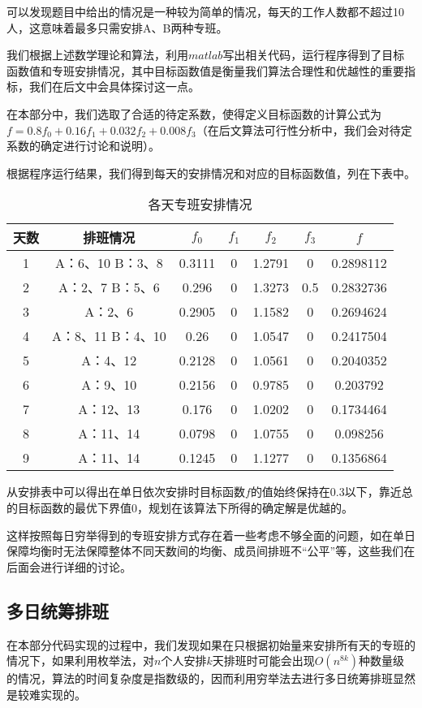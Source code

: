 \documentclass{article}
\begin{document}
	可以发现题目中给出的情况是一种较为简单的情况，每天的工作人数都不超过10人，这意味着最多只需安排A、B两种专班。
	
	我们根据上述数学理论和算法，利用$matlab$写出相关代码，运行程序得到了目标函数值和专班安排情况，其中目标函数值是衡量我们算法合理性和优越性的重要指标，我们在后文中会具体探讨这一点。
	
	在本部分中，我们选取了合适的待定系数，使得定义目标函数的计算公式为$f=0.8f_0+0.16f_1+0.032f_2+0.008f_3$（在后文算法可行性分析中，我们会对待定系数的确定进行讨论和说明）。
	
	根据程序运行结果，我们得到每天的安排情况和对应的目标函数值，列在下表中。
	\newpage
	\begin{table}[!h]
		\centering
		\caption{各天专班安排情况}
		\begin{tabular}{|c|c|c|c|c|c|c|}
			\hline
			天数 & 排班情况          & $f_0$  & $f_1$ & $f_2$  & $f_3$ & $f$     \\
			\hline
			1  & A：6、10 B：3、8  & 0.3111 & 0     & 1.2791 & 0     & 0.2898112 \\
			2  & A：2、7 B：5、6   & 0.296  & 0     & 1.3273 & 0.5   & 0.2832736 \\
			3  & A：2、6         & 0.2905 & 0     & 1.1582 & 0     & 0.2694624 \\
			4  & A：8、11 B：4、10 & 0.26   & 0     & 1.0547 & 0     & 0.2417504 \\
			5  & A：4、12        & 0.2128 & 0     & 1.0561 & 0     & 0.2040352 \\
			6  & A：9、10        & 0.2156 & 0     & 0.9785 & 0     & 0.203792  \\
			7  & A：12、13       & 0.176  & 0     & 1.0202 & 0     & 0.1734464 \\
			8  & A：11、14       & 0.0798 & 0     & 1.0755 & 0     & 0.098256  \\
			9  & A：11、14       & 0.1245 & 0     & 1.1277 & 0     & 0.1356864 \\
			\hline
		\end{tabular}
	\end{table}
	
	从安排表中可以得出在单日依次安排时目标函数$f$的值始终保持在0.3以下，靠近总的目标函数的最优下界值0，规划在该算法下所得的确定解是优越的。
	
	这样按照每日穷举得到的专班安排方式存在着一些考虑不够全面的问题，如在单日保障均衡时无法保障整体不同天数间的均衡、成员间排班不“公平”等，这些我们在后面会进行详细的讨论。
	

	\subsection{多日统筹排班}
	在本部分代码实现的过程中，我们发现如果在只根据初始量来安排所有天的专班的情况下，如果利用枚举法，对$n$个人安排$k$天排班时可能会出现$O(n^{8k})$种数量级的情况，算法的时间复杂度是指数级的，因而利用穷举法去进行多日统筹排班显然是较难实现的。
	
\end{document}

